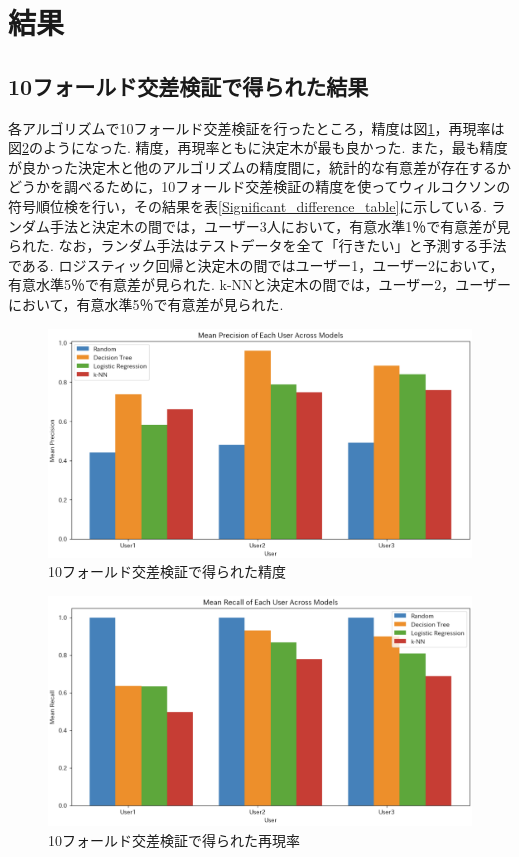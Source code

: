 \documentclass[12pt,a4j]{jreport}
\begin{document}
\section{結果}
\subsection{10フォールド交差検証で得られた結果}
各アルゴリズムで10フォールド交差検証を行ったところ，精度は図\ref{fig7}，再現率は図\ref{fig8}のようになった.
精度，再現率ともに決定木が最も良かった.
また，最も精度が良かった決定木と他のアルゴリズムの精度間に，統計的な有意差が存在するかどうかを調べるために，10フォールド交差検証の精度を使ってウィルコクソンの符号順位検を行い，その結果を表\ref{Significant_difference_table}に示している.
ランダム手法と決定木の間では，ユーザー3人において，有意水準1％で有意差が見られた.
なお，ランダム手法はテストデータを全て「行きたい」と予測する手法である.
ロジスティック回帰と決定木の間ではユーザー1，ユーザー2において，有意水準5％で有意差が見られた.
k-NNと決定木の間では，ユーザー2，ユーザーにおいて，有意水準5％で有意差が見られた.

\begin{figure}[htbp]
  \begin{center}
    \includegraphics[width=14cm]{fig7.png}
    \caption{10フォールド交差検証で得られた精度}
    \label{fig7}
  \end{center}
\end{figure}

\begin{figure}[htbp]
  \begin{center}
    \includegraphics[width=14cm]{fig8.png}
    \caption{10フォールド交差検証で得られた再現率}
    \label{fig8}
  \end{center}
\end{figure}
\end{document}
